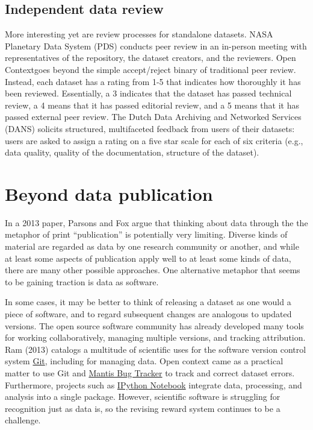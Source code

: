 \documentclass[10pt,a4paper,twocolumn]{article}
\begin{document}
\subsection*{Independent data review}
More interesting yet are review processes for standalone datasets. 
NASA Planetary Data System (PDS)\cite{nasa_pds} conducts peer review in an in-person meeting with representatives of the repository, the dataset creators, and the reviewers. 
Open Context\href{http://opencontext.org/} goes beyond the simple accept/reject binary of traditional peer review.\cite{kansa_we_2013} 
Instead, each dataset has a rating from 1-5 that indicates how thoroughly it has been reviewed. 
Essentially, a 3 indicates that the dataset has passed technical review, a 4 means that it has passed editorial review, and a 5 means that it has passed external peer review. 
The Dutch Data Archiving and Networked Services (DANS) solicits structured, multifaceted feedback from users of their datasets: users are asked to assign a rating on a five star scale for each of six criteria (e.g., data quality, quality of the documentation, structure of the dataset)\cite{grootveld_data_2011,grootveld_peer_2012}. %



\section*{Beyond data publication}\label{beyond-data-publication}

In a 2013 paper, Parsons and Fox\cite{parsons_is_2013} argue that thinking about data through the the metaphor of print ``publication'' is potentially very limiting.
Diverse kinds of material are regarded as data by one research community or another, and while at least some aspects of publication apply well to at least some kinds of data, there are many other possible approaches.
One alternative metaphor that seems to be gaining traction is data as software.\cite{schopf_treating_2012}

In some cases, it may be better to think of releasing a dataset as one would a piece of software, and to regard subsequent changes are analogous to updated versions.
The open source software community has already developed many tools for working collaboratively, managing multiple versions, and tracking attribution.
Ram (2013)\cite{ram_git_2013} catalogs a multitude of scientific uses for the software version control system \href{http://git-scm.com/}{Git}, including for managing data.
Open context came as a practical matter to use Git and \href{http://www.mantisbt.org/}{Mantis Bug Tracker} to track and correct dataset errors.
Furthermore, projects such as \href{http://ipython.org/notebook}{IPython Notebook} integrate data, processing, and analysis into a single package.
However, scientific software is struggling for recognition\cite{pradal_publishing_2013} just as data is, so the revising reward system continues to be a challenge.
\end{document}
